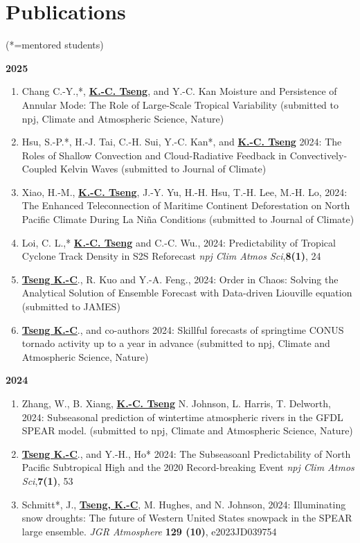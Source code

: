 \documentclass{article}
\begin{document}
\section{\color{airforceblue}Publications} (*=mentored students)\par
\normalsize{\bf{2025}} 
\begin{enumerate} [resume] 
	\item Chang C.-Y.,*, \normalsize{\bf{\underline{K.-C. Tseng}}}, and Y.-C. Kan Moisture and Persistence of Annular Mode: The Role of Large-Scale Tropical Variability (submitted to npj, Climate and Atmospheric Science, Nature) 
	\item Hsu, S.-P.*, H.-J. Tai, C.-H. Sui, Y.-C. Kan*, and \normalsize{\bf{\underline{K.-C. Tseng}}} 2024: The Roles of Shallow Convection and Cloud-Radiative Feedback in Convectively-Coupled Kelvin Waves (submitted to Journal of Climate)
	\item Xiao, H.-M., \normalsize{\bf{\underline{K.-C. Tseng}}}, J.-Y. Yu, H.-H. Hsu, T.-H. Lee, M.-H. Lo, 2024: The Enhanced Teleconnection of Maritime Continent Deforestation on North Pacific Climate During La Niña Conditions (submitted to Journal of Climate)
	\item Loi, C. L.,* \normalsize{\bf{\underline{K.-C. Tseng}}} and C.-C. Wu., 2024: Predictability of Tropical Cyclone Track Density in S2S Reforecast  \textit{npj Clim Atmos Sci},\normalsize{\bf{8(1)}}, 24
	\item \normalsize{\bf{\underline{Tseng K.-C}}}., R. Kuo and Y.-A. Feng., 2024: Order in Chaos: Solving the Analytical Solution of Ensemble Forecast with Data-driven Liouville equation (submitted to JAMES)
	\item \normalsize{\bf{\underline{Tseng K.-C}}}., and co-authors 2024: Skillful forecasts of springtime CONUS tornado activity up to a year in advance (submitted to npj, Climate and Atmospheric Science, Nature) 

\end{enumerate}	
\normalsize{\bf{2024}} 
\begin{enumerate} 
	\item Zhang, W., B. Xiang, \normalsize{\bf{\underline{K.-C. Tseng}}} N. Johnson, L. Harris, T. Delworth, 2024: Subseasonal prediction of wintertime atmospheric rivers in the GFDL SPEAR model. (submitted to npj, Climate and Atmospheric Science, Nature)
	\item \normalsize{\bf{\underline{Tseng K.-C}}}., and Y.-H., Ho* 2024: The Subseasoanl Predictability of North Pacific Subtropical High and the 2020 Record-breaking Event \textit{npj Clim Atmos Sci},\normalsize{\bf{7(1)}}, 53
	\item Schmitt*, J., \normalsize{\bf{\underline{Tseng, K.-C}}}, M. Hughes, and N. Johnson, 2024: Illuminating snow droughts: The future of Western United States snowpack in the SPEAR large ensemble. \textit{JGR Atmosphere} \normalsize{\bf{129 (10)}}, e2023JD039754
\end{enumerate}	
\end{document}
